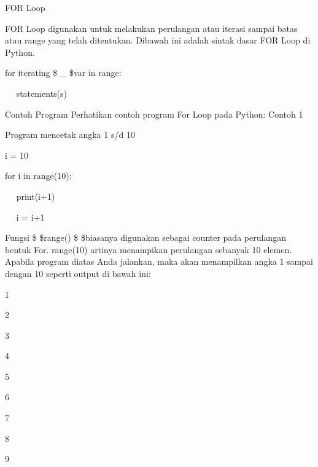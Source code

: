 FOR Loop \par
FOR Loop digunakan untuk melakukan perulangan atau iterasi sampai batas atau range yang telah ditentukan.\vspace{\baselineskip}
\vspace{\baselineskip}
Dibawah ini adalah sintak dasar FOR Loop di Python.\vspace{\baselineskip}
\vspace{\baselineskip}
 \par
for iterating \$  \_  \$var in range: \par
~~ statements(s) \par
\vspace{\baselineskip}
Contoh Program\vspace{\baselineskip}
\vspace{\baselineskip}
Perhatikan contoh program For Loop pada Python:\vspace{\baselineskip}
\vspace{\baselineskip}
Contoh 1\vspace{\baselineskip}
\vspace{\baselineskip}
 \par
Program mencetak angka 1 s/d 10 \par
\vspace{12pt}
i = 10 \par
for i in range(10): \par
~~ print(i+1) \par
~~ i = i+1 \par
\vspace{\baselineskip}
Fungsi \$  \$range() \$  \$biasanya digunakan sebagai counter pada perulangan bentuk For. range(10) artinya menampikan perulangan sebanyak 10 elemen.\vspace{\baselineskip}
\vspace{\baselineskip}
Apabila program diatas Anda jalankan, maka akan menampilkan angka 1 sampai dengan 10 seperti output di bawah ini:\vspace{\baselineskip}
\vspace{\baselineskip}
 \par
1 \par
2 \par
3 \par
4 \par
5 \par
6 \par
7 \par
8 \par
9 \par
